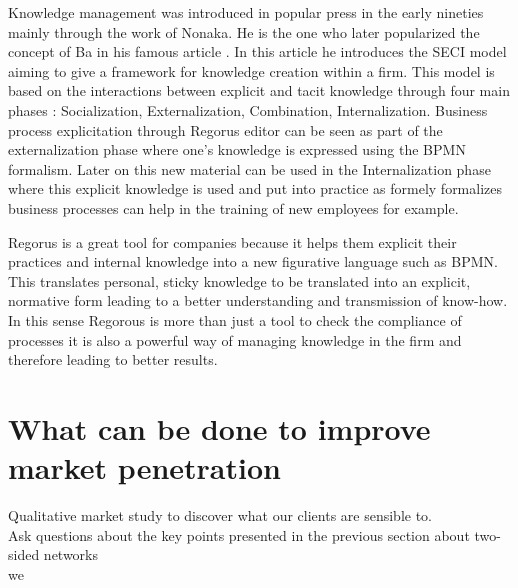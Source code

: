 \documentclass[10pt]{report}
\begin{document}
Knowledge management was introduced in popular press in the early nineties mainly through the work of Nonaka. \autocite{nonaka1991knowledge} He is the one who later popularized the concept of Ba in his famous article \autocite{Nonaka_Konno_1998}. In this article he introduces the SECI model aiming to give a framework for knowledge creation within a firm. This model is based on the interactions between explicit and tacit knowledge through four main phases : Socialization, Externalization, Combination, Internalization. Business process explicitation through Regorus editor can be seen as part of the externalization phase where one's knowledge is expressed using the BPMN formalism. Later on this new material can be used in the Internalization phase where this explicit knowledge is used and put into practice as formely formalizes business processes can help in the training of new employees for example.

Regorus is a great tool for companies because it helps them explicit their practices and internal knowledge into a new figurative language such as BPMN. This translates personal, sticky knowledge to be translated into an explicit, normative form leading to a better understanding and transmission of know-how. In this sense Regorous is more than just a tool to check the compliance of processes it is also a powerful way of managing knowledge in the firm and therefore leading to better results.

\section{What can be done to improve market penetration}
Qualitative market study to discover what our clients are sensible to.\\
Ask questions about the key points presented in the previous section about two-sided networks\\

we 

\newpage

\newpage

\pagestyle{plain}

\nocite{*}
\setlength{\bibitemsep}{5pt}

\printbibliography[title={Technological references},keyword={tech}, heading=subbibliography]
\printbibliography[title={Strategic references},keyword={strat}, heading=subbibliography]

\printbibliography[title={Other references}, notkeyword={tech}, notkeyword={strat}, heading=subbibliography]
\end{document}
